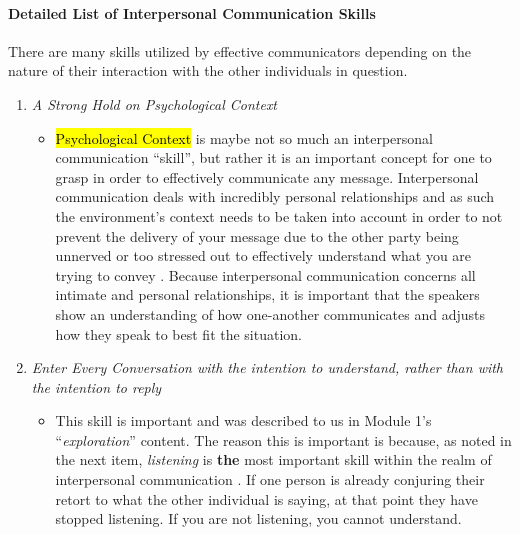 \documentclass[stu,12pt]{apa7}
\begin{document}
    \paragraph{Detailed List of Interpersonal Communication Skills}
      There are many skills utilized by effective communicators depending on the
        nature of their interaction with the other individuals in question.
      \begin{enumerate}
        \item \textit{A Strong Hold on Psychological Context}
          \begin{itemize}
            \item \hl{Psychological Context} is maybe not so much an
              interpersonal communication ``skill'', but rather it is an
              important concept for one to grasp in order to effectively
              communicate any message. Interpersonal communication deals with
              incredibly personal relationships and as such the environment's
              context needs to be taken into account in order to not prevent
              the delivery of your message due to the other party being unnerved
              or too stressed out to effectively understand what you are
              trying to convey \parencite{noauthor_communication_2013}.
              Because interpersonal communication concerns all intimate and
              personal relationships, it is important that the speakers show an
              understanding of how one-another communicates and adjusts how they
              speak to best fit the situation.
          \end{itemize}
        \item \textit{%
          Enter Every Conversation with the intention to understand, rather %
            than with the intention to reply%
        }
          \begin{itemize}
            \item This skill is important and was described to us in Module
              1's ``\textit{exploration}'' content. The reason this is important
              is because, as noted in the next item, \emph{listening} is
              \textbf{the} most important skill within the realm of
              interpersonal communication \parencite{headlee_10_2015}. If
              one person is already conjuring their retort to what the other
              individual is saying, at that point they have stopped listening.
              If you are not listening, you cannot understand.
          \end{itemize}

\end{enumerate}
\end{document}
